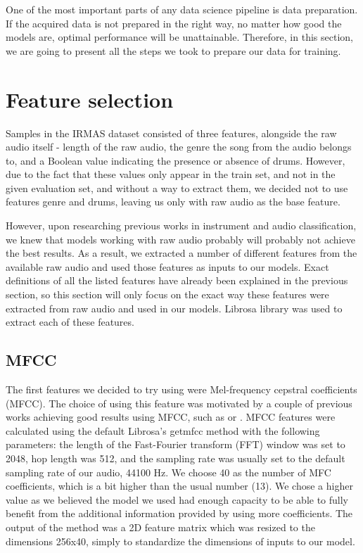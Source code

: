 
One of the most important parts of any data science pipeline is data preparation. If the acquired data is not prepared in the right way, no matter how good the models are, optimal performance will be unattainable. Therefore, in this section, we are going to present all the steps we took to prepare our data for training. 

\section{Feature selection}

Samples in the IRMAS dataset consisted of three features, alongside the raw audio itself - length of the raw audio, the genre the song from the audio belongs to, and a Boolean value indicating the presence or absence of drums. However, due to the fact that these values only appear in the train set, and not in the given evaluation set, and without a way to extract them, we decided not to use features genre and drums, leaving us only with raw audio as the base feature. 

However, upon researching previous works in instrument and audio classification, we knew that models working with raw audio probably will probably not achieve the best results. As a result, we extracted a number of different features from the available raw audio and used those features as inputs to our models. Exact definitions of all the listed features have already been explained in the previous section, so this section will only focus on the exact way these features were extracted from raw audio and used in our models. Librosa  \space \space library was used to extract each of these features.

\subsection{MFCC}
\label{sec:data-prep:mfcc}

The first features we decided to try using were Mel-frequency cepstral coefficients (MFCC). The choice of using this feature was motivated by a couple of previous works achieving good results using MFCC, such as \cite{Racharla_2020} or \cite{Diment2013ModifiedGD}. MFCC features were calculated using the default Librosa's get\textunderscore mfcc method with the following parameters: the length of the Fast-Fourier transform (FFT) window was set to 2048, hop length was 512, and the sampling rate was usually set to the default sampling rate of our audio, 44100 Hz. We choose 40 as the number of MFC coefficients, which is a bit higher than the usual number (13). We chose a higher value as we believed the model we used had enough capacity to be able to fully benefit from the additional information provided by using more coefficients. The output of the method was a 2D feature matrix which was resized to the dimensions 256x40, simply to standardize the dimensions of inputs to our model.

